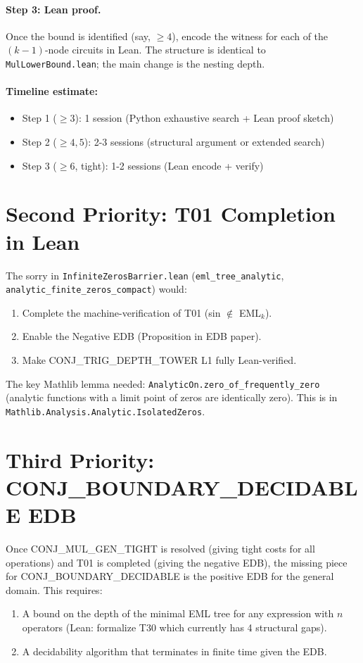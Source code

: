 \documentclass[11pt]{article}
\begin{document}
\paragraph{Step 3: Lean proof.}
Once the bound is identified (say, $\geq 4$), encode the witness for each of the
$(k-1)$-node circuits in Lean. The structure is identical to
\texttt{MulLowerBound.lean}; the main change is the nesting depth.

\paragraph{Timeline estimate:}
\begin{itemize}
\item Step 1 ($\geq 3$): 1 session (Python exhaustive search + Lean proof sketch)
\item Step 2 ($\geq 4, 5$): 2-3 sessions (structural argument or extended search)
\item Step 3 ($\geq 6$, tight): 1-2 sessions (Lean encode + verify)
\end{itemize}

\section{Second Priority: T01 Completion in Lean}

The sorry in \texttt{InfiniteZerosBarrier.lean}
(\texttt{eml\_tree\_analytic}, \texttt{analytic\_finite\_zeros\_compact}) would:
\begin{enumerate}
\item Complete the machine-verification of T01 (sin $\notin$ EML$_k$).
\item Enable the Negative EDB (Proposition in EDB paper).
\item Make CONJ\_TRIG\_DEPTH\_TOWER L1 fully Lean-verified.
\end{enumerate}

The key Mathlib lemma needed: \texttt{AnalyticOn.zero\_of\_frequently\_zero}
(analytic functions with a limit point of zeros are identically zero).
This is in \texttt{Mathlib.Analysis.Analytic.IsolatedZeros}.

\section{Third Priority: CONJ\_BOUNDARY\_DECIDABLE EDB}

Once CONJ\_MUL\_GEN\_TIGHT is resolved (giving tight costs for all operations)
and T01 is completed (giving the negative EDB), the missing piece for
CONJ\_BOUNDARY\_DECIDABLE is the positive EDB for the general domain.
This requires:
\begin{enumerate}
\item A bound on the depth of the minimal EML tree for any expression with $n$ operators
  (Lean: formalize T30 which currently has 4 structural gaps).
\item A decidability algorithm that terminates in finite time given the EDB.
\end{enumerate}
\end{document}
